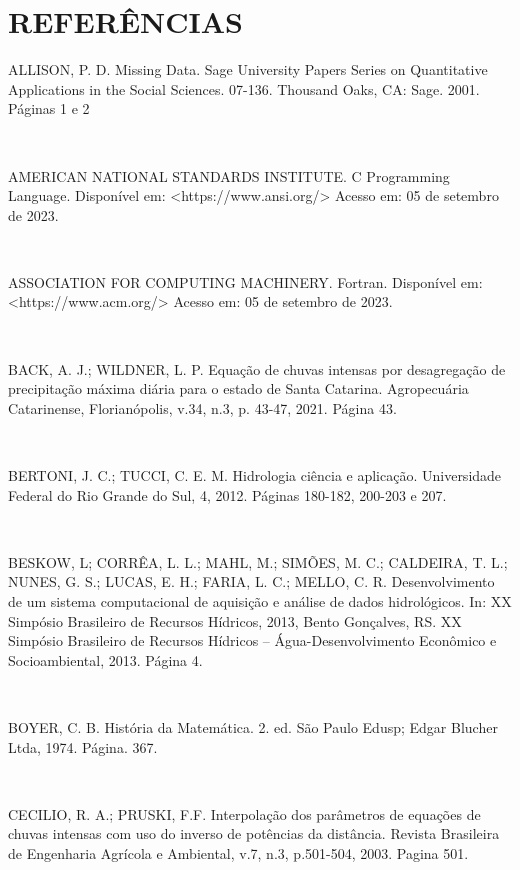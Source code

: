 \chapter{REFERÊNCIAS}

\begin{flushleft}
\singlespacing
ALLISON, P. D. Missing Data. Sage University Papers Series on Quantitative Applications in the Social Sciences. 07-136. Thousand Oaks, CA: Sage. 2001. Páginas 1 e 2

\

AMERICAN NATIONAL STANDARDS INSTITUTE. C Programming Language. Disponível em: <https://www.ansi.org/> Acesso em: 05 de setembro de 2023.

\

ASSOCIATION FOR COMPUTING  MACHINERY. Fortran. Disponível em: <https://www.acm.org/> Acesso em: 05 de setembro de 2023.

\

BACK, A. J.; WILDNER, L. P. Equação de chuvas intensas por desagregação de precipitação máxima diária para o estado de Santa Catarina. Agropecuária Catarinense, Florianópolis, v.34, n.3, p. 43-47, 2021. Página 43.

\

BERTONI, J. C.; TUCCI, C. E. M. Hidrologia ciência e aplicação. Universidade Federal do Rio Grande do Sul, 4, 2012. Páginas 180-182,  200-203 e 207.

\

BESKOW, L; CORRÊA, L. L.; MAHL, M.; SIMÕES, M. C.; CALDEIRA, T. L.; NUNES, G. S.; LUCAS, E. H.; FARIA, L. C.; MELLO, C. R. Desenvolvimento de um sistema computacional de aquisição e análise de dados hidrológicos. In: XX Simpósio Brasileiro de Recursos Hídricos, 2013, Bento Gonçalves, RS. XX Simpósio Brasileiro de Recursos Hídricos – Água-Desenvolvimento Econômico e Socioambiental, 2013. Página 4.

\

BOYER, C. B. História da Matemática. 2. ed. São Paulo Edusp; Edgar Blucher Ltda, 1974. Página. 367.

\

CECILIO, R. A.; PRUSKI, F.F. Interpolação dos parâmetros de equações de chuvas intensas com uso do inverso de potências da distância. Revista Brasileira de Engenharia Agrícola e Ambiental, v.7, n.3, p.501-504, 2003. Pagina 501.


\end{flushleft}
